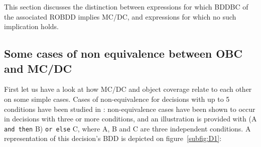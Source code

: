\documentclass[a4paper,12pt,twoside]{article}
\newcommand{\andthen}{\texttt{and then}}
\newcommand{\orelse}{\texttt{or else}}
\begin{document}
This section discusses the distinction between expressions for which
BDDBC of the associated ROBDD implies MC/DC, and expressions for which
no such implication holds.

\subsection{Some cases of non equivalence between OBC and MC/DC}

First let us have a look at how MC/DC and object coverage relate to each
other on some simple cases. Cases of non-equivalence for decisions with up to
5 conditions have been studied in \cite{ar0720}: non-equivalence cases
have been shown to occur in decisions with three or more conditions,
and an illustration is provided with (A \andthen{} B) \orelse{} C,
where A, B and C are three independent conditions.
%
A representation of this decision's BDD is depicted on
figure~\ref{subfig:D1}:
\end{document}
